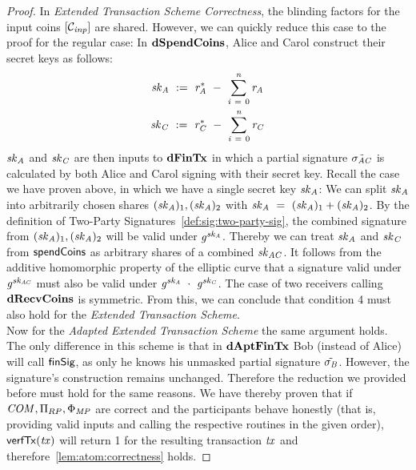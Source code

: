 \begin{proof}
    In \emph{Extended Transaction Scheme Correctness}, the blinding factors for the input coins $[\mathcal{C}_{\mathit{inp}}]$ are shared.
    However, we can quickly reduce this case to the proof for the regular case:
    In $\mathbf{dSpendCoins}$, Alice and Carol construct their secret keys as follows:
    \begin{gather}
        \mathit{sk}_{\mathit{A}} ~:=~ \mathit{r}_{\mathit{A}}^* ~-~ \sum_{\mathit{i} ~=~ 0}^{\mathit{n}} \mathit{r}_{\mathit{A}} \\
        \mathit{sk}_{\mathit{C}} ~:=~ \mathit{r}_{\mathit{C}}^* ~-~ \sum_{\mathit{i} ~=~ 0}^{\mathit{n}} \mathit{r}_{\mathit{C}}
    \end{gather}
    $\mathit{sk}_{\mathit{A}}$ and $\mathit{sk}_{\mathit{C}}$ are then inputs to $\mathbf{dFinTx}$ in which a partial signature $\tilde{\sigma_{\mathit{A}\mathit{C}}}$ is calculated by both Alice and Carol signing with their secret key.
    Recall the case we have proven above, in which we have a single secret key $\mathit{sk}_{\mathit{A}}$:
    We can split $\mathit{sk}_{\mathit{A}}$ into arbitrarily chosen shares $(\mathit{sk}_{\mathit{A}})_1, (\mathit{sk}_{\mathit{A}})_2$ with $\mathit{sk}_{\mathit{A}} ~=~ (\mathit{sk}_{\mathit{A}})_1 + (\mathit{sk}_{\mathit{A}})_2$.
    By the definition of Two-Party Signatures~\cref{def:sig:two-party-sig}, the combined signature from $(\mathit{sk}_{\mathit{A}})_1, (\mathit{sk}_{\mathit{A}})_2$ will be valid under $\mathit{g}^{\mathit{sk}_{\mathit{A}}}$.
    Thereby we can treat $\mathit{sk}_{\mathit{A}}$ and $\mathit{sk}_{\mathit{C}}$ from $\mathsf{spendCoins}$ as arbitrary shares of a combined $\mathit{sk}_{\mathit{A}\mathit{C}}$.
    It follows from the additive homomorphic property of the elliptic curve that a signature valid under $\mathit{g}^{\mathit{sk}_{\mathit{A}\mathit{C}}}$ must also be valid under $\mathit{g}^{\mathit{sk}_{\mathit{A}}} ~\cdot~ \mathit{g}^{\mathit{sk}_{\mathit{C}}}$.
    The case of two receivers calling $\mathbf{dRecvCoins}$ is symmetric.
    From this, we can conclude that condition 4 must also hold for the \emph{Extended Transaction Scheme}. \\
    Now for the \emph{Adapted Extended Transaction Scheme} the same argument holds.
    The only difference in this scheme is that in $\mathbf{dAptFinTx}$ Bob (instead of Alice) will call $\mathsf{finSig}$, as only he knows his unmasked partial signature $\tilde{\sigma_{\mathit{B}}}$.
    However, the signature's construction remains unchanged.
    Therefore the reduction we provided before must hold for the same reasons.
    We have thereby proven that if $\mathit{COM}, \Pi_{RP}, \Phi_{\mathit{MP}}$ are correct and the participants behave honestly (that is, providing valid inputs and calling the respective routines in the given order), $\mathsf{verfTx}(\mathit{tx})$ will return 1 for the resulting transaction $\mathit{tx}$ and therefore~\cref{lem:atom:correctness} holds.
\end{proof}

